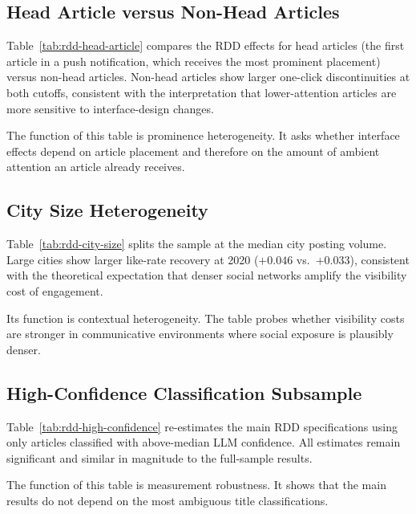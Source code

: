 \documentclass[12pt, american]{article}
\begin{document}
\subsection{Head Article versus Non-Head Articles}

Table~\ref{tab:rdd-head-article} compares the RDD effects for head articles (the first article in a push notification, which receives the most prominent placement) versus non-head articles. Non-head articles show larger one-click discontinuities at both cutoffs, consistent with the interpretation that lower-attention articles are more sensitive to interface-design changes.

The function of this table is prominence heterogeneity. It asks whether interface effects depend on article placement and therefore on the amount of ambient attention an article already receives.



\subsection{City Size Heterogeneity}

Table~\ref{tab:rdd-city-size} splits the sample at the median city posting volume. Large cities show larger like-rate recovery at 2020 ($+0.046$ vs.\ $+0.033$), consistent with the theoretical expectation that denser social networks amplify the visibility cost of engagement.

Its function is contextual heterogeneity. The table probes whether visibility costs are stronger in communicative environments where social exposure is plausibly denser.



\subsection{High-Confidence Classification Subsample}

Table~\ref{tab:rdd-high-confidence} re-estimates the main RDD specifications using only articles classified with above-median LLM confidence. All estimates remain significant and similar in magnitude to the full-sample results.

The function of this table is measurement robustness. It shows that the main results do not depend on the most ambiguous title classifications.


\end{document}
